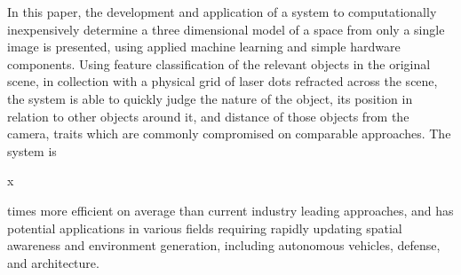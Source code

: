 In this paper, the development and application of a system to computationally inexpensively determine a three dimensional model of a space from only a single image is presented, using applied machine learning and simple hardware components. Using feature classification of the relevant objects in the original scene, in collection with a physical grid of laser dots refracted across the scene, the system is able to quickly judge the nature of the object, its position in relation to other objects around it, and distance of those objects from the camera, traits which are commonly compromised on comparable approaches. The system is \begin{it}x\end{it} times more efficient on average than current industry leading approaches, and has potential applications in various fields requiring rapidly updating spatial awareness and environment generation, including autonomous vehicles, defense, and architecture.